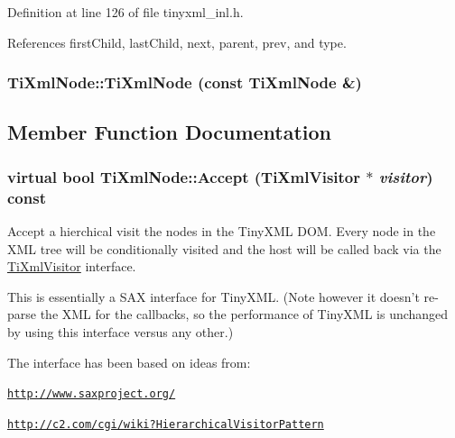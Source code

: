 Definition at line 126 of file tinyxml\_\-inl.h.

References firstChild, lastChild, next, parent, prev, and type.\hypertarget{class_ti_xml_node_a5ca3233e05032d121b13fac8273de68d}{
\subsubsection[{TiXmlNode}]{\setlength{\rightskip}{0pt plus 5cm}TiXmlNode::TiXmlNode (const {\bf TiXmlNode} \&)}}
\label{class_ti_xml_node_a5ca3233e05032d121b13fac8273de68d}


\subsection{Member Function Documentation}
\hypertarget{class_ti_xml_node_acc0f88b7462c6cb73809d410a4f5bb86}{
\subsubsection[{Accept}]{\setlength{\rightskip}{0pt plus 5cm}virtual bool TiXmlNode::Accept ({\bf TiXmlVisitor} $\ast$ {\em visitor}) const}}
\label{class_ti_xml_node_acc0f88b7462c6cb73809d410a4f5bb86}
Accept a hierchical visit the nodes in the TinyXML DOM. Every node in the XML tree will be conditionally visited and the host will be called back via the \hyperlink{class_ti_xml_visitor}{TiXmlVisitor} interface.

This is essentially a SAX interface for TinyXML. (Note however it doesn't re-\/parse the XML for the callbacks, so the performance of TinyXML is unchanged by using this interface versus any other.)

The interface has been based on ideas from:


\begin{DoxyItemize}
\item \href{http://www.saxproject.org/}{\tt http://www.saxproject.org/}
\item \href{http://c2.com/cgi/wiki?HierarchicalVisitorPattern}{\tt http://c2.com/cgi/wiki?HierarchicalVisitorPattern}
\end{DoxyItemize}

